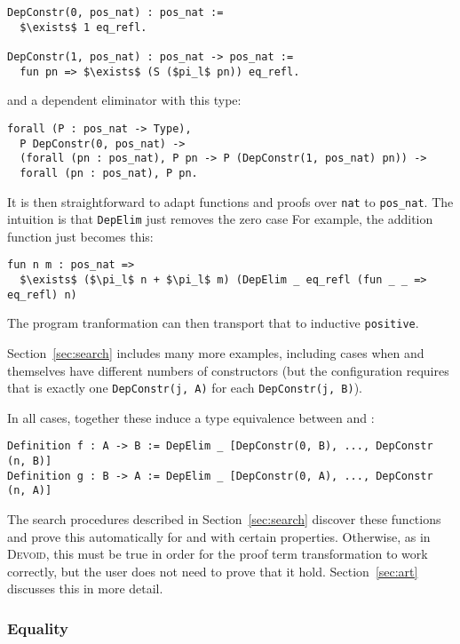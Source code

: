 \begin{lstlisting}
DepConstr(0, pos_nat) : pos_nat :=
  $\exists$ 1 eq_refl.

DepConstr(1, pos_nat) : pos_nat -> pos_nat :=
  fun pn => $\exists$ (S ($pi_l$ pn)) eq_refl.
\end{lstlisting} %
and a dependent eliminator with this type:

\begin{lstlisting}
forall (P : pos_nat -> Type),
  P DepConstr(0, pos_nat) ->
  (forall (pn : pos_nat), P pn -> P (DepConstr(1, pos_nat) pn)) ->
  forall (pn : pos_nat), P pn.
\end{lstlisting}
It is then straightforward to adapt functions and proofs over \lstinline{nat} to \lstinline{pos_nat}.
The intuition is that \lstinline{DepElim} just removes the zero case 
For example, the addition function just becomes this:

\begin{lstlisting}
fun n m : pos_nat =>
  $\exists$ ($\pi_l$ n + $\pi_l$ m) (DepElim _ eq_refl (fun _ _ => eq_refl) n)
\end{lstlisting} %
The program tranformation can then transport that to inductive \lstinline{positive}.

Section~\ref{sec:search} includes many more examples, including cases when \A and \B
themselves have different numbers of constructors (but the configuration requires that
is exactly one \lstinline{DepConstr(j, A)} for each \lstinline{DepConstr(j, B)}).

In all cases, together these induce a type equivalence between \A and \B:

\begin{lstlisting}
Definition f : A -> B := DepElim _ [DepConstr(0, B), ..., DepConstr (n, B)]
Definition g : B -> A := DepElim _ [DepConstr(0, A), ..., DepConstr (n, A)]
\end{lstlisting}
The search procedures described in Section~\ref{sec:search} discover these functions and prove this automatically
for \A and \B with certain properties.
Otherwise, as in \textsc{Devoid}, this must be true in order for the proof term transformation
to work correctly, but the user does not need to prove that it hold.
Section~\ref{sec:art} discusses this in more detail.

\subsubsection{Equality}
\label{sec:equality}

